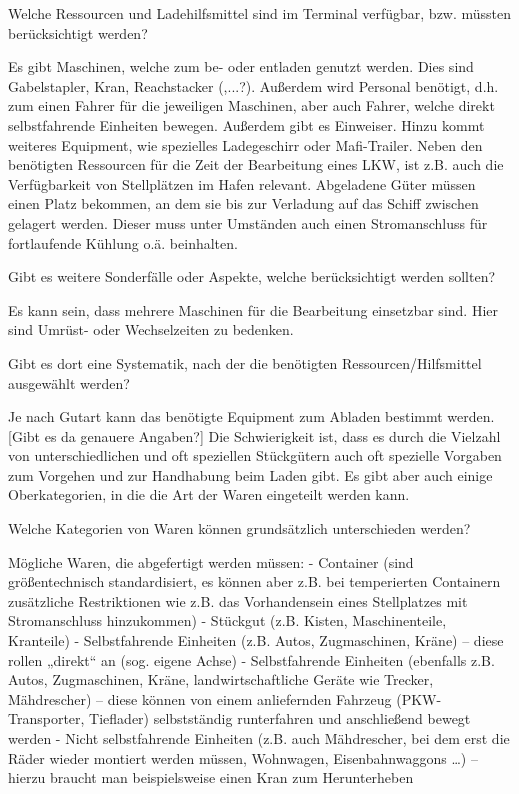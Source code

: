 Welche Ressourcen und Ladehilfsmittel sind im Terminal verfügbar, bzw. müssten berücksichtigt werden?

Es gibt Maschinen, welche zum be- oder entladen genutzt werden. Dies sind Gabelstapler, Kran, Reachstacker (,...?). Außerdem wird Personal benötigt, d.h. zum einen Fahrer für die jeweiligen Maschinen, aber auch Fahrer, welche direkt selbstfahrende Einheiten bewegen. Außerdem gibt es Einweiser. Hinzu kommt weiteres Equipment, wie spezielles Ladegeschirr oder Mafi-Trailer. Neben den benötigten Ressourcen für die Zeit der Bearbeitung eines LKW, ist z.B. auch die Verfügbarkeit von Stellplätzen im Hafen relevant. Abgeladene Güter müssen einen Platz bekommen, an dem sie bis zur Verladung auf das Schiff zwischen gelagert werden. Dieser muss unter Umständen auch einen Stromanschluss für fortlaufende Kühlung o.ä. beinhalten.


Gibt es weitere Sonderfälle oder Aspekte, welche berücksichtigt werden sollten?

Es kann sein, dass mehrere Maschinen für die Bearbeitung einsetzbar sind. Hier sind Umrüst- oder Wechselzeiten zu bedenken.


Gibt es dort eine Systematik, nach der die benötigten Ressourcen/Hilfsmittel ausgewählt werden?

Je nach Gutart kann das benötigte Equipment zum Abladen bestimmt werden. [Gibt es da genauere Angaben?] Die Schwierigkeit ist, dass es durch die Vielzahl von unterschiedlichen und oft speziellen Stückgütern auch oft spezielle Vorgaben zum Vorgehen und zur Handhabung beim Laden gibt. Es gibt aber auch einige Oberkategorien, in die die Art der Waren eingeteilt werden kann.


Welche Kategorien von Waren können grundsätzlich unterschieden werden?

Mögliche Waren, die abgefertigt werden müssen:
- Container (sind größentechnisch standardisiert, es können aber z.B. bei temperierten Containern zusätzliche Restriktionen wie z.B. das Vorhandensein eines Stellplatzes mit Stromanschluss hinzukommen)
- Stückgut (z.B. Kisten, Maschinenteile, Kranteile)
- Selbstfahrende Einheiten (z.B. Autos, Zugmaschinen, Kräne) – diese rollen „direkt“ an (sog. eigene Achse)
- Selbstfahrende Einheiten (ebenfalls z.B. Autos, Zugmaschinen, Kräne, landwirtschaftliche Geräte wie Trecker, Mähdrescher) – diese können von einem anliefernden Fahrzeug (PKW-Transporter, Tieflader) selbstständig runterfahren und anschließend bewegt werden
- Nicht selbstfahrende Einheiten (z.B. auch Mähdrescher, bei dem erst die Räder wieder montiert werden müssen, Wohnwagen, Eisenbahnwaggons …) – hierzu braucht man beispielsweise einen Kran zum Herunterheben


